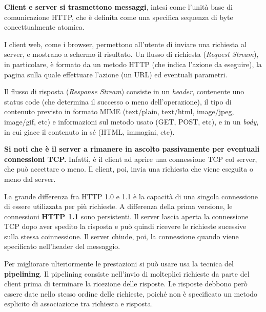 \vspace{3mm}

\textbf{Client e server si trasmettono messaggi}, intesi come l’unità base di comunicazione HTTP, che è definita come una specifica sequenza di byte concettualmente atomica.

\vspace{3mm}

I client web, come i browser, permettono all'utente di inviare una richiesta al server, e mostrano a schermo il risultato. Un flusso di richiesta (\textit{Request Stream}), in particolare, è formato da un metodo HTTP (che indica l'azione da eseguire), la pagina sulla quale effettuare l'azione (un URL) ed eventuali parametri.

\vspace{3mm}

Il flusso di risposta (\textit{Response Stream}) consiste in un \textit{header}, contenente uno status code (che determina il successo o meno dell'operazione), il tipo di contenuto previsto in formato MIME (text/plain, text/html, image/jpeg, image/gif, etc) e informazioni sul metodo usato (GET, POST, etc), e in un \textit{body}, in cui giace il contenuto in sé (HTML, immagini, etc).

\vspace{3mm}

\textbf{Si noti che è il server a rimanere in ascolto passivamente per eventuali connessioni TCP.} Infatti, è il client ad aprire una connessione TCP col server, che può accettare o meno. Il client, poi, invia una richiesta che viene eseguita o meno dal server.

\vspace{3mm}

La grande differenza fra HTTP 1.0 e 1.1 è la capacità di una singola connessione di essere utilizzata per più richieste. A differenza della prima versione, le connessioni \textbf{HTTP 1.1} sono persistenti. Il server lascia aperta la connessione TCP dopo aver spedito la risposta e può quindi ricevere le richieste sucessive sulla stessa coinnessione. Il server chiude, poi, la connessione quando viene specificato nell'header del messaggio. 

\vspace{3mm}

Per migliorare ulteriormente le prestazioni si può usare usa la tecnica del \textbf{pipelining}. Il pipelining consiste nell’invio di molteplici richieste da parte del client prima di terminare la ricezione delle risposte. Le risposte debbono però essere date nello stesso ordine delle richieste, poiché non è specificato un metodo esplicito di associazione tra richiesta e risposta.

